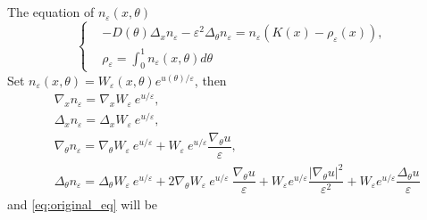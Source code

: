 \documentclass[preprint]{elsarticle}
\numberwithin{equation}{section}
\begin{document}
\begin{frontmatter}
\title{}
%

\begin{abstract}

\end{abstract}

\end{frontmatter}
\section{}
The equation of $n_\varepsilon (x,\theta)$
\begin{equation}\label{eq:original_eq}
\left\{
\begin{aligned}
&-D(\theta)\Delta_x n_\varepsilon -\varepsilon^2\Delta_\theta n_\varepsilon = n_\varepsilon(K(x)-\rho_\varepsilon(x)),\\
&\rho_\varepsilon = \int_0^1n_\varepsilon(x,\theta) d\theta
\end{aligned}
\right.
\end{equation}
Set $n_\varepsilon(x,\theta) = W_\varepsilon(x,\theta) e^{u(\theta)/\varepsilon}$, then
\begin{equation}
\begin{aligned}
&\nabla_x n_\varepsilon = \nabla_x W_\varepsilon ~e^{u/\varepsilon},\\
&\Delta_x n_\varepsilon = \Delta_x W_\varepsilon ~e^{u/\varepsilon},\\
&\nabla_\theta n_\varepsilon = \nabla_\theta W_\varepsilon ~e^{u/\varepsilon} + W_\varepsilon ~e^{u/\varepsilon} \dfrac{\nabla_\theta u}{\varepsilon},\\
&\Delta_\theta n_\varepsilon = \Delta_\theta W_\varepsilon ~e^{u/\varepsilon} + 2\nabla_\theta W_\varepsilon~e^{u/\varepsilon}~\dfrac{\nabla_\theta u}{\varepsilon} + W_\varepsilon e^{u/\varepsilon}\dfrac{|\nabla_\theta u|^2}{\varepsilon^2} + W_\varepsilon e^{u/\varepsilon}\dfrac{\Delta_\theta u}{\varepsilon}
\end{aligned}
\end{equation}
and \eqref{eq:original_eq} will be
\end{document}
